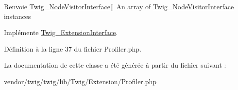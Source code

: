 \begin{DoxyReturn}{Renvoie}
\hyperlink{interface_twig___node_visitor_interface}{Twig\+\_\+\+Node\+Visitor\+Interface}\mbox{[}\mbox{]} An array of \hyperlink{interface_twig___node_visitor_interface}{Twig\+\_\+\+Node\+Visitor\+Interface} instances 
\end{DoxyReturn}


Implémente \hyperlink{interface_twig___extension_interface_aec02093179d390d22ae4083f23a1d74a}{Twig\+\_\+\+Extension\+Interface}.



Définition à la ligne 37 du fichier Profiler.\+php.



La documentation de cette classe a été générée à partir du fichier suivant \+:\begin{DoxyCompactItemize}
\item 
vendor/twig/twig/lib/\+Twig/\+Extension/Profiler.\+php\end{DoxyCompactItemize}
